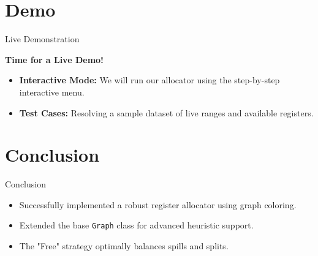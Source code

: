\documentclass{beamer}
\begin{document}
\section{Demo}
\begin{frame}{Live Demonstration}
    \begin{center}
        \Large \textbf{Time for a Live Demo!}
    \end{center}
    \vspace{0.5cm}
    \begin{itemize}
        \item \textbf{Interactive Mode:} We will run our allocator using the step-by-step interactive menu.
        \item \textbf{Test Cases:} Resolving a sample dataset of live ranges and available registers.
    \end{itemize}
\end{frame}

\section{Conclusion}
\begin{frame}{Conclusion}
    \begin{itemize}
        \item Successfully implemented a robust register allocator using graph coloring.
        \item Extended the base \texttt{Graph} class for advanced heuristic support.
        \item The "Free" strategy optimally balances spills and splits.
    \end{itemize}
\end{frame}
\end{document}

